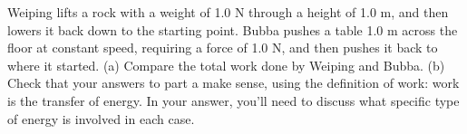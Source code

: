 Weiping lifts a rock with a weight of 1.0 N through a
height of 1.0 m, and then lowers it back down to the
starting point. Bubba pushes a table 1.0 m across the
floor at constant speed, requiring a force of 1.0 N, and
then pushes it back to where it started. (a) Compare the total
work done by Weiping and Bubba. (b) Check that your answers
to part a make sense, using the definition of work: work is
the transfer of energy. In your answer, you'll need to discuss
what specific type of energy is involved in each case.
